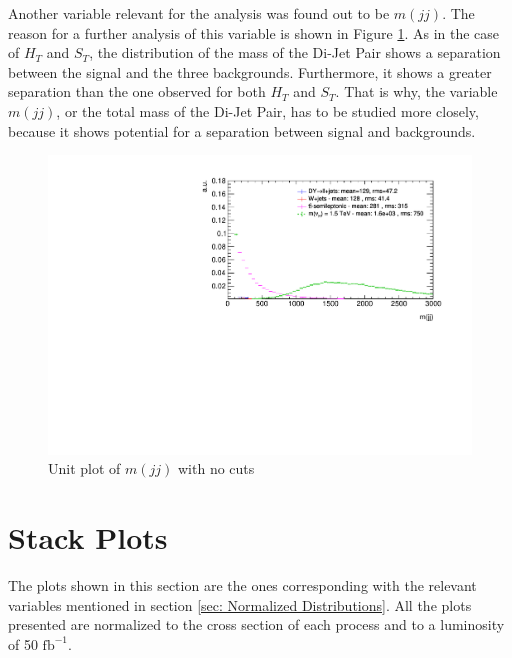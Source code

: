 Another variable relevant for the analysis was found out to be $m(jj)$. The reason for a further analysis of this variable is shown in Figure \ref{fig: mjjUnitNC}. As in the case of $H_{T}$ and $S_{T}$, the distribution of the mass of the Di-Jet Pair shows a separation between the signal and the three backgrounds. Furthermore, it shows a greater separation than the one observed for both $H_{T}$ and $S_{T}$. That is why, the variable $m(jj)$, or the total mass of the Di-Jet Pair, has to be studied more closely, because it shows potential for a separation between signal and backgrounds.

\begin{figure}
\centering
\includegraphics[width=\linewidth]{Plots/mjj_unitNC.pdf}
\caption{Unit plot of $m(jj)$ with no cuts}
\label{fig: mjjUnitNC}
\end{figure}


\section{Stack Plots}\label{section: stackPlots}

The plots shown in this section are the ones corresponding with the relevant variables mentioned in section \ref{sec: Normalized Distributions}. All the plots presented are normalized to the cross section of each process and to a luminosity of 50 $\text{fb}^{-1}$. 

